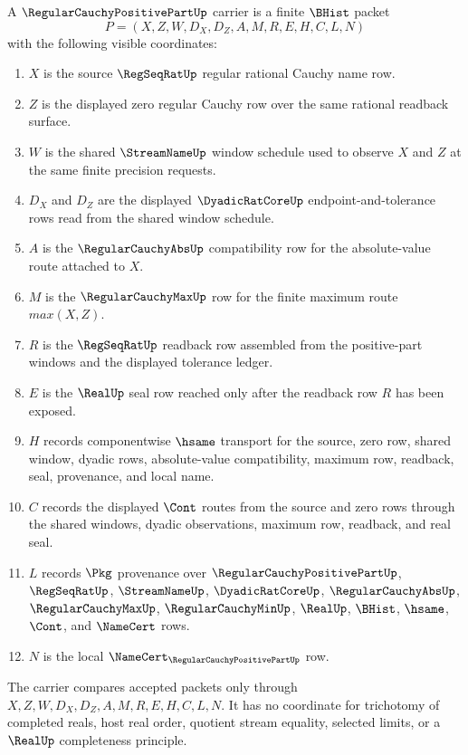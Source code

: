 \begin{definition}
\label{def:regular-cauchy-positive-part-carrier}
A $\RegularCauchyPositivePartUp$ carrier is a finite $\BHist$ packet
$$
P=(X,Z,W,D_X,D_Z,A,M,R,E,H,C,L,N)
$$
with the following visible coordinates:
\begin{enumerate}
\item $X$ is the source $\RegSeqRatUp$ regular rational Cauchy name row.
\item $Z$ is the displayed zero regular Cauchy row over the same rational readback surface.
\item $W$ is the shared $\StreamNameUp$ window schedule used to observe $X$ and $Z$ at the same finite precision requests.
\item $D_X$ and $D_Z$ are the displayed $\DyadicRatCoreUp$ endpoint-and-tolerance rows read from the shared window schedule.
\item $A$ is the $\RegularCauchyAbsUp$ compatibility row for the absolute-value route attached to $X$.
\item $M$ is the $\RegularCauchyMaxUp$ row for the finite maximum route $max(X,Z)$.
\item $R$ is the $\RegSeqRatUp$ readback row assembled from the positive-part windows and the displayed tolerance ledger.
\item $E$ is the $\RealUp$ seal row reached only after the readback row $R$ has been exposed.
\item $H$ records componentwise $\hsame$ transport for the source, zero row, shared window, dyadic rows, absolute-value compatibility, maximum row, readback, seal, provenance, and local name.
\item $C$ records the displayed $\Cont$ routes from the source and zero rows through the shared windows, dyadic observations, maximum row, readback, and real seal.
\item $L$ records $\Pkg$ provenance over $\RegularCauchyPositivePartUp$, $\RegSeqRatUp$, $\StreamNameUp$, $\DyadicRatCoreUp$, $\RegularCauchyAbsUp$, $\RegularCauchyMaxUp$, $\RegularCauchyMinUp$, $\RealUp$, $\BHist$, $\hsame$, $\Cont$, and $\NameCert$ rows.
\item $N$ is the local $\NameCert_{\RegularCauchyPositivePartUp}$ row.
\end{enumerate}
The carrier compares accepted packets only through $X,Z,W,D_X,D_Z,A,M,R,E,H,C,L,N$. It has no coordinate for trichotomy of completed reals, host real order, quotient stream equality, selected limits, or a $\RealUp$ completeness principle.
\end{definition}

